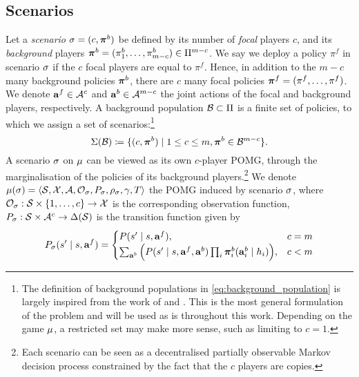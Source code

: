 \subsection{Scenarios}
Let a \emph{scenario} $\sigma=(c, \boldsymbol{\pi}^b)$ be defined by its number of \emph{focal} players $c$, and its \emph{background} players $\boldsymbol{\pi}^b = (\pi^b_1, \dots, \pi^b_{m-c}) \in \Pi^{m-c}$. We say we deploy a policy $\pi^f$ in scenario $\sigma$ if the $c$ focal players are equal to $\pi^f$. Hence, in addition to the $m-c$ many background policies $\boldsymbol{\pi}^b$, there are $c$ many focal policies $\boldsymbol{\pi}^f = (\pi^f, \dots, \pi^f)$. We denote $ \mathbf{a}^f \in \mathcal{A}^c$ and $\mathbf{a}^b \in \mathcal{A}^{m-c}$ the joint actions of the focal and background players, respectively.
A background population $\mathcal{B} \subset \Pi$ is a finite set of policies, to which we assign a set of scenarios:\footnote{The definition of background populations in \eqref{eq:background_population} is largely inspired from the work of \citet{leibo_scalable_evaluation_multi_2021} and \citet{agapiou_melting_pot_2_2023}. This is the most general formulation of the problem and will be used as is throughout this work. Depending on the game $\mu$, a restricted set may make more sense, such as limiting to $c=1$.}
\begin{equation}
\label{eq:background_population}
\Sigma(\mathcal{B}) \coloneqq \{(c, \boldsymbol{\pi}^b) \mid 1 \leq c \leq m, \boldsymbol{\pi}^b \in \mathcal{B}^{m-c}\}.
\end{equation}
A scenario $\sigma$ on $\mu$ can be viewed as its own $c$-player POMG, through the marginalisation of the policies of its background players.\footnote{Each scenario can be seen as a decentralised partially observable Markov decision process \citep{oliehoek_decentralized_pomdps_2012} constrained by the fact that the $c$ players are copies.} We denote $\mu(\sigma) = \langle \mathcal{S}, \mathcal{X}, \mathcal{A}, \mathcal{O}_\sigma, P_\sigma, \rho_\sigma, \gamma ,T \rangle$ the POMG induced by scenario $\sigma$, where $\mathcal{O}_\sigma: \mathcal{S} \times \{1, \dots, c\} \rightarrow \mathcal{X} $ is the corresponding observation function, $P_\sigma: \mathcal{S} \times \mathcal{A}^c \rightarrow \Delta(\mathcal{S})$ is the transition function given by  
\begin{equation*}
P_{\sigma}(s' \mid s, \mathbf{a}^f) =
\begin{cases}
P(s' \mid s, \mathbf{a}^f), & c = m \\
\sum_{\mathbf{a}^b} \Big(P(s' \mid s, \mathbf{a}^f, \mathbf{a}^b) 
\prod_{i} \boldsymbol{\pi}^b_i (\mathbf{a}^b_i \mid h_i)\Big), & c < m \\
\end{cases}
\end{equation*}

